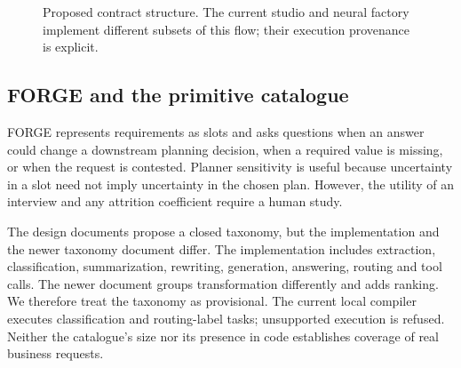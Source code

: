 \documentclass[11pt,a4paper]{article}
\begin{document}
\begin{figure}[ht]
\centering
\small
{}
\caption{Proposed contract structure. The current studio and neural factory
implement different subsets of this flow; their execution provenance is explicit.}
\end{figure}

\subsection{FORGE and the primitive catalogue}
FORGE represents requirements as slots and asks questions when an answer could
change a downstream planning decision, when a required value is missing, or
when the request is contested. Planner sensitivity is useful because uncertainty
in a slot need not imply uncertainty in the chosen plan. However, the utility of
an interview and any attrition coefficient require a human study.

The design documents propose a closed taxonomy, but the implementation and the
newer taxonomy document differ. The implementation includes extraction,
classification, summarization, rewriting, generation, answering, routing and
tool calls. The newer document groups transformation differently and adds
ranking. We therefore treat the taxonomy as provisional. The current local
compiler executes classification and routing-label tasks; unsupported execution
is refused. Neither the catalogue's size nor its presence in code establishes
coverage of real business requests.
\end{document}
